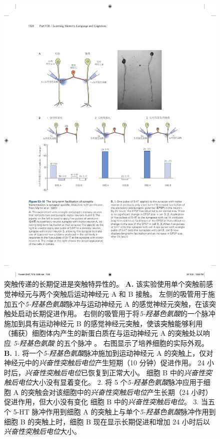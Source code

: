 \begin{figure}[htbp]
	\centering
	\includegraphics[width=0.95\linewidth]{chap53/fig_53_10}
	\caption{突触传递的长期促进是突触特异性的\cite{martin1997synapse}。
		\textbf{A.} 该实验使用单个突触前感觉神经元与两个突触后运动神经元 A 和 B 接触。
		左侧的吸管用于施加五个\textit{5-羟基色氨酸}脉冲与运动神经元 A 的感觉神经元突触，在该突触处启动长期促进作用。
		右侧的吸管用于将\textit{5-羟基色氨酸}的一个脉冲施加到具有运动神经元 B 的感觉神经元突触，使该突触能够利用（捕获）细胞体内产生的新蛋白质在与运动神经元 A 的突触处以响应 \textit{5-羟基色氨酸} 的五个脉冲  。
		右图显示了培养细胞的实际外观。
		\textbf{B.} 1. 将一个\textit{5-羟基色氨酸}脉冲施加到运动神经元 A 的突触上，仅对神经元中的\textit{兴奋性突触后电位}产生短期（10 分钟）促进作用。
		24 小时后，\textit{兴奋性突触后电位}已恢复到正常大小。
		细胞 B 中的\textit{兴奋性突触后电位}大小没有显着变化。
		2. 将 5 个\textit{5-羟基色氨酸}脉冲应用于细胞 A 的突触会对该细胞中的\textit{兴奋性突触后电位}产生长期（24 小时）促进作用，但大小没有变化 细胞 B 中的\textit{兴奋性突触后电位}。
		3. 当五个 5-HT 脉冲作用到细胞 A 的突触上与单个\textit{5-羟基色氨酸}脉冲作用到细胞 B 的突触上时，细胞 B 现在显示长期促进和增加 24 小时后以\textit{兴奋性突触后电位}大小。}
	\label{fig:53_10}
\end{figure}


